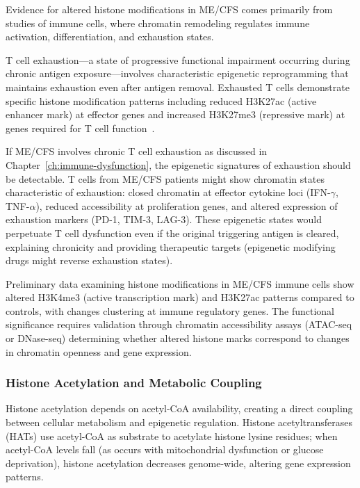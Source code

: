 Evidence for altered histone modifications in ME/CFS comes primarily from studies of immune cells, where chromatin remodeling regulates immune activation, differentiation, and exhaustion states.

\begin{hypothesis}
T cell exhaustion---a state of progressive functional impairment occurring during chronic antigen exposure---involves characteristic epigenetic reprogramming that maintains exhaustion even after antigen removal. Exhausted T cells demonstrate specific histone modification patterns including reduced H3K27ac (active enhancer mark) at effector genes and increased H3K27me3 (repressive mark) at genes required for T cell function~\cite{iu2024tcell_exhaustion}.

If ME/CFS involves chronic T cell exhaustion as discussed in Chapter~\ref{ch:immune-dysfunction}, the epigenetic signatures of exhaustion should be detectable. T cells from ME/CFS patients might show chromatin states characteristic of exhaustion: closed chromatin at effector cytokine loci (IFN-$\gamma$, TNF-$\alpha$), reduced accessibility at proliferation genes, and altered expression of exhaustion markers (PD-1, TIM-3, LAG-3). These epigenetic states would perpetuate T cell dysfunction even if the original triggering antigen is cleared, explaining chronicity and providing therapeutic targets (epigenetic modifying drugs might reverse exhaustion states).
\end{hypothesis}

Preliminary data examining histone modifications in ME/CFS immune cells show altered H3K4me3 (active transcription mark) and H3K27ac patterns compared to controls, with changes clustering at immune regulatory genes. The functional significance requires validation through chromatin accessibility assays (ATAC-seq or DNase-seq) determining whether altered histone marks correspond to changes in chromatin openness and gene expression.

\subsubsection{Histone Acetylation and Metabolic Coupling}

Histone acetylation depends on acetyl-CoA availability, creating a direct coupling between cellular metabolism and epigenetic regulation. Histone acetyltransferases (HATs) use acetyl-CoA as substrate to acetylate histone lysine residues; when acetyl-CoA levels fall (as occurs with mitochondrial dysfunction or glucose deprivation), histone acetylation decreases genome-wide, altering gene expression patterns.

